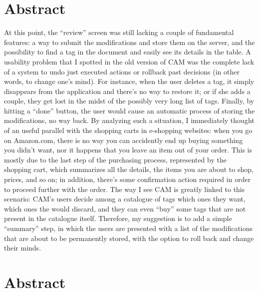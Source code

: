 \documentclass[12pt,oneside,svgnames]{memoir}
\author{}
\date{}
\begin{document}

\addtocounter{page}{-1} %
\null
\thispagestyle{empty}%
\addtocounter{page}{-1}%
\newpage

{
\hypersetup{linkcolor=black}
\setcounter{tocdepth}{2}
\tableofcontents
}
\chapter*{Abstract}\label{abstract}

At this point, the ``review'' screen was still lacking a couple of
fundamental features: a way to submit the modifications and store them
on the server, and the possibility to find a tag in the document and
easily see its details in the table. A usability problem that I spotted
in the old version of CAM was the complete lack of a system to undo just
executed actions or rollback past decisions (in other words, to change
one's mind). For instance, when the user deletes a tag, it simply
disappears from the application and there's no way to restore it; or if
she adds a couple, they get lost in the midst of the possibly very long
list of tags. Finally, by hitting a ``done'' button, the user would
cause an automatic process of storing the modifications, no way back. By
analyzing such a situation, I immediately thought of an useful parallel
with the shopping carts in e-shopping websites: when you go on
Amazon.com, there is no way you can accidently end up buying something
you didn't want, nor it happens that you leave an item out of your
order. This is mostly due to the last step of the purchasing process,
represented by the shopping cart, which summarizes all the details, the
items you are about to shop, prices, and so on; in addition, there's
some confirmation action required in order to proceed further with the
order. The way I see CAM is greatly linked to this scenario: CAM's users
decide among a catalogue of tags which ones they want, which ones the
would discard, and they can even ``buy'' some tags that are not present
in the catalogue itself. Therefore, my suggestion is to add a simple
``summary'' step, in which the users are presented with a list of the
modifications that are about to be permanently stored, with the option
to roll back and change their minds.

\chapter*{Abstract}\label{abstract-1}
\end{document}
